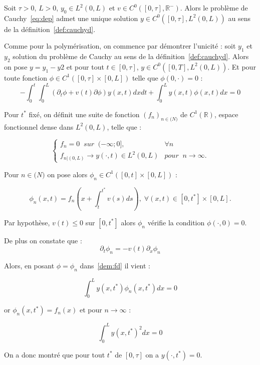 \documentclass[a4paper]{article}
\begin{document}
\begin{theoreme}
	Soit $\tau >0$, $L>0$, $y_0 \in L^2(0,L)$ et $v \in C^0([0,\tau],\mathbb{R}^-)$.
	Alors le problème de Cauchy~\eqref{eq:dep} admet une unique solution $y \in C^0([0,\tau],L^2(0,L))$ au sens de la définition~\ref{def:cauchyd}.
\end{theoreme}

\begin{preuve}
	Comme pour la polymérisation, on commence par démontrer l'unicité : 
	soit $y_1$ et $y_2$ solution du problème de Cauchy au sens de la définition~\ref{def:cauchyd}. 
	Alors on pose $y=y_1-y2$ et pour tout $t \in [0,\tau]$, $y \in C^0([0,T],L^2(0,L))$.
	Et pour toute fonction $\phi \in C^1([0,\tau] \times [0,L])$ telle que $\phi (0,\cdot)=0$ :
\begin{equation}
	\label{dem:fd}
	-\int_0^t \int_0^L (\partial_t \phi +v(t)\partial \phi) y(x,t) dxdt 
			+ \int_0^L y(x,t) \phi (x,t) dx =0
\end{equation}

	Pour $t^*$ fixé, on définit une suite de fonction $(f_n)_{n \in \mathbb(N)}$ de $C^1(\mathbb{R})$, espace fonctionnel dense dans $L^2(0,L)$, telle que :
	
\[
\begin{cases}
	f_n =0 \; \; sur \; \; (-\infty;0], & \forall n \\
	f_{n|(0,L)} \to y(\cdot,t) \in L^2(0,L) & pour \; \;  n\rightarrow \infty.
\end{cases}
\]

Pour $n \in \mathbb(N)$ on pose alors $\phi_n \in C^1([0,t]\times [0,L])$ :

\[ \phi_n(x,t) = f_n(x + \int_t^{t^*} v(s)ds), \; \forall (x,t) \in [0,t^*]\times [0,L]. \]

Par hypothèse, $v(t) \leq 0$ sur $[0, t^*]$ alors $\phi_n$ vérifie la condition $\phi (\cdot, 0)=0$.

De plus on constate que :
\[ \partial_t \phi_n = -v(t) \partial_x \phi_n \]

Alors, en posant $\phi = \phi_n$ dans~\eqref{dem:fd} il vient :

\[ \int_0^L y(x,t^*) \phi_n (x,t^*) dx =0 \]

or $\phi_n (x,t^*) = f_n(x)$ et pour $n \rightarrow \infty$ :

\[ \int_0^L y(x,t^*)^2 dx =0 \]

On a donc montré que pour tout $t^*$ de $[0,\tau]$ on a $y(\cdot, t^*) =0 $.


	
\end{preuve}
\end{document}
